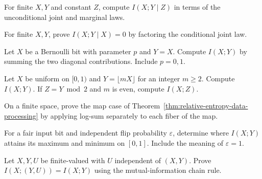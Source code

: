 \documentclass[11pt,oneside]{book}
\theoremstyle{definition}
\theoremstyle{remark}
\begin{document}
\begin{practiceexercise}
\label{pex:conditional-mutual-constant}
For finite $X,Y$ and constant $Z$, compute $I(X;Y\mid Z)$ in
terms of the unconditional joint and marginal laws.
\end{practiceexercise}

\begin{practiceexercise}
\label{pex:conditional-mutual-observed}
For finite $X,Y$, prove $I(X;Y\mid X)=0$ by factoring the
conditional joint law.
\end{practiceexercise}

\begin{practiceexercise}
\label{pex:mutual-information-biased-copy}
Let $X$ be a Bernoulli bit with parameter $p$ and $Y=X$.
Compute $I(X;Y)$ by summing the two diagonal contributions.
Include $p=0,1$.
\end{practiceexercise}

\begin{practiceexercise}
\label{pex:mutual-information-quantized-copy}
Let $X$ be uniform on $[0,1)$ and $Y=\lfloor mX\rfloor$ for an
integer $m\geq2$. Compute $I(X;Y)$. If $Z=Y\bmod2$ and $m$ is
even, compute $I(X;Z)$.
\end{practiceexercise}

\begin{practiceexercise}
\label{pex:information-processing-log-sum}
On a finite space, prove the map case of
Theorem~\ref{thm:relative-entropy-data-processing} by applying
log-sum separately to each fiber of the map.
\end{practiceexercise}

\begin{practiceexercise}
\label{pex:mutual-information-complete-noise}
For a fair input bit and independent flip probability
$\varepsilon$, determine where $I(X;Y)$ attains its maximum
and minimum on $[0,1]$. Include the meaning of $\varepsilon=1$.
\end{practiceexercise}

\begin{practiceexercise}
\label{pex:mutual-information-independent-noise}
Let $X,Y,U$ be finite-valued with $U$ independent of $(X,Y)$.
Prove $I(X;(Y,U))=I(X;Y)$ using the mutual-information chain rule.
\end{practiceexercise}
\end{document}
